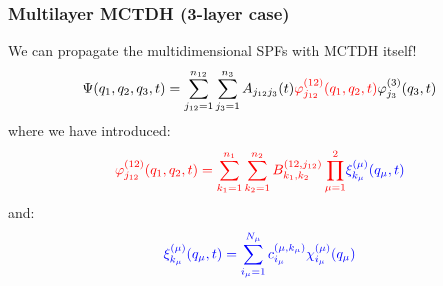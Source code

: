 \documentclass{beamer}
\begin{document}
\begin{frame}
  \frametitle{Multilayer MCTDH (3-layer case)}
We can propagate the multidimensional SPFs with MCTDH itself!
\begin{equation}
	\Psi(q_1, q_2, q_3, t) = \sum_{j_{12}=1}^{n_{12}}\sum_{j_3 = 1}^{n_3}A_{j_{12}j_3}(t)\textcolor{red}{\varphi^{(12)}_{j_{12}}(q_1,q_2,t)}\varphi^{(3)}_{j_{3}}(q_3,t)
\end{equation}
where we have introduced:
\begin{equation}
	\textcolor{red}{\varphi^{(12)}_{j_{12}}(q_1,q_2,t) = \sum_{k_1 = 1}^{n_1}\sum_{k_2=1}^{n_2}B_{k_1,k_2}^{(12,j_{12})}\prod_{\mu=1}^2} \textcolor{blue}{\xi_{k_{\mu}}^{(\mu)}(q_{\mu},t)}
\end{equation}
and:
\begin{equation}
	\textcolor{blue}{\xi_{k_{\mu}}^{(\mu)}(q_{\mu},t) = \sum_{i_{\mu}=1}^{N_{\mu}} c_{i_{\mu}}^{(\mu,k_{\mu})}\chi_{i_{\mu}}^{(\mu)}(q_{\mu})}
\end{equation}
\end{frame}
\end{document}
